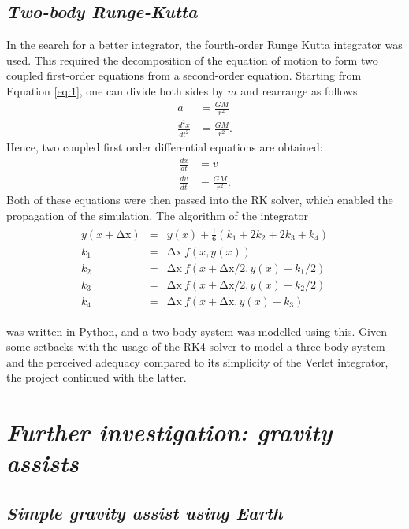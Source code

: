 \documentclass[12pt, english]{report}
\begin{document}
\subsection{\textsl{Two-body Runge-Kutta}}
\normalsize{\noindent In the search for a better integrator, the fourth-order Runge Kutta integrator was used. This required the decomposition of the equation of motion to form two coupled first-order equations from a second-order equation. Starting from Equation \ref{eq:1}, one can divide both sides by $m$ and rearrange as follows
\begin{align}
    a &= \frac{GM}{r^2} \\
    \frac{d^2x}{dt^2} &= \frac{GM}{r^2}.
\end{align}
Hence, two coupled first order differential equations are obtained:
\begin{align}
    \frac{dx}{dt} &= v \\
    \frac{dv}{dt} &= \frac{GM}{r^2}.
\end{align}
Both of these equations were then passed into the RK solver, which enabled the propagation of the simulation. The algorithm of the integrator
\begin{align}
\begin{matrix} 
y(x+\mathrm{\Delta x})&=&y(x)+\frac{1}{6}\left(k_1+2k_2+2k_3+k_4\right)\\k_1&=&\mathrm{\Delta x}\ f(x,y(x))\\k_2&=&\mathrm{\Delta x}\ f(x+\mathrm{\Delta x}/2,y(x)+k_1/2)\\k_3&=&\mathrm{\Delta x}\ f(x+\mathrm{\Delta x}/2,y(x)+k_2/2)\\k_4&=&\mathrm{\Delta x}\ f(x+\mathrm{\Delta x},y(x)+k_3) \end{matrix}
\end{align}

was written in Python, and a two-body system was modelled using this. Given some setbacks with the usage of the RK4 solver to model a three-body system and the perceived adequacy compared to its simplicity of the Verlet integrator, the project continued with the latter.}

\section{\textsl{Further investigation: gravity assists}}
\subsection{\textsl{Simple gravity assist using Earth}}
\end{document}
